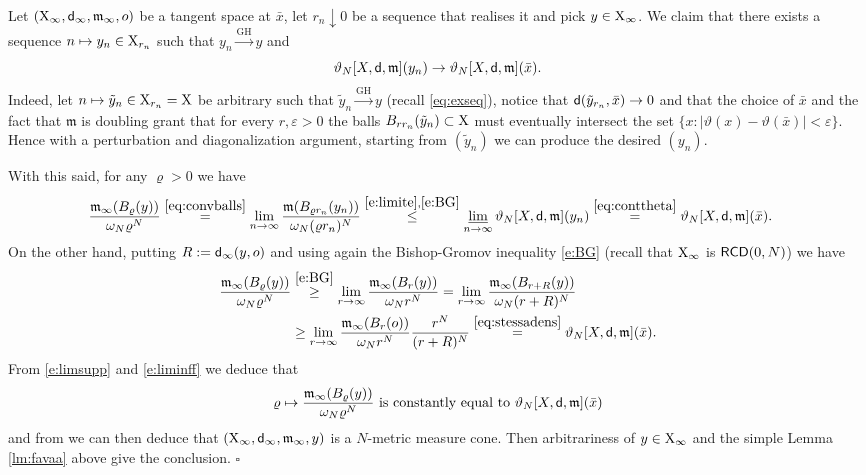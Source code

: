 \documentclass[reqno,11pt]{article}
\numberwithin{equation}{section}
\newcommand{\mm}{{\mbox{\boldmath$m$}}}
\newcommand{\sfd}{{\sf d}}
\newcommand{\eps}{\varepsilon}
\newcommand{\limi}{\varliminf}
\renewcommand{\mm}{\mathfrak m}                                %
\renewenvironment{proof}{\removelastskip\par\medskip   %
\noindent{\em Proof} \rm}{\penalty-20\null\hfill$\square$\par\medbreak}
\newcommand{\X}{{\rm X}}
\newcommand{\RCD}{{\sf RCD}}
\begin{document}
\begin{proof}
Let \((\X_\infty, \sfd_\infty,\mm_\infty,o)\) be a tangent space at \(\bar x\), let \(r_n\downarrow 0\) be a sequence that realises it and pick $y\in \X_\infty$. We claim that there exists a sequence $n\mapsto y_n\in\X_{r_n}$ such that \(y_n\overset{\text{GH}}{\rightarrow} y\) and
\begin{equation}
\label{eq:conttheta}
 \vartheta_N[X, \sfd, \mm](y_n)\to \vartheta_N[X, \sfd, \mm](\bar x).
\end{equation}
Indeed, let $n\mapsto \tilde y_n\in \X_{r_n}=\X$ be arbitrary such that  \(\tilde y_n\overset{\text{GH}}{\rightarrow} y\) (recall \eqref{eq:exseq}), notice that $\sfd(\tilde y_{r_n},\bar x)\to 0$ and  that the choice of $\bar x$ and the fact that $\mm$ is doubling grant that for every $r,\eps>0$ the balls $B_{rr_n}(\tilde y_n)\subset \X$ must eventually intersect the set $\{x:|\vartheta(x)-\vartheta(\bar x)|<\eps\}$. Hence with a perturbation and diagonalization argument, starting from $(\tilde y_n)$ we can produce the desired $(y_n)$.

With this said, for any   \(\varrho>0\) we have
\begin{equation}
\label{e:limsupp}
\begin{split}
\frac{\mm_\infty(B_\varrho(y))}{\omega_N\varrho^N}&\stackrel{\eqref{eq:convballs}}=\lim_{n\to \infty}\frac{\mm(B_{\varrho r_n} (y_n))}{\omega_N(\varrho r_n)^N}\stackrel{\eqref{e:limite},\eqref{e:BG}}\le \limi_{n\to\infty}   \vartheta_N[X, \sfd, \mm](y_n)\stackrel{\eqref{eq:conttheta}}=\vartheta_N[X, \sfd, \mm](\bar x).
\end{split}
\end{equation}
On the other hand, putting $R:=\sfd_\infty(y,o)$ and using again  the Bishop-Gromov inequality \eqref{e:BG} (recall that $\X_\infty$ is $\RCD(0,N)$) we have
\begin{equation}
\label{e:liminff}
\begin{split}
\frac{\mm_\infty(B_\varrho(y))}{\omega_N\varrho^N}&\stackrel{\eqref{e:BG}}\ge \lim_{r\to \infty} \frac{\mm_\infty(B_r(y))}{\omega_Nr^N}=\lim_{r\to \infty} \frac{\mm_\infty(B_{r+R}(y))}{\omega_N(r+R)^N}\\
&\ge \lim_{r\to \infty} \frac{\mm_\infty(B_{r}(o))}{\omega_Nr^N} \frac{r^N}{(r+R)^N}\stackrel{\eqref{eq:stessadens}}=\vartheta_N[X, \sfd, \mm](\bar x).
\end{split}
\end{equation}
From  \eqref{e:limsupp} and \eqref{e:liminff} we deduce that 
\begin{equation}
\label{eq:rN}
\text{$\varrho\mapsto \frac{\mm_\infty(B_\varrho(y))}{\omega_N\varrho^N}$ is constantly equal to }\vartheta_N[X, \sfd, \mm](\bar x)
\end{equation} 
and from \cite{DPG16} we can then deduce that $(\X_\infty,\sfd_\infty,\mm_\infty,y)$ is a $N$-metric measure cone. Then  arbitrariness of  $y\in \X_\infty$ and the simple Lemma \ref{lm:favaa} above give the conclusion.
\end{proof}
\end{document}

